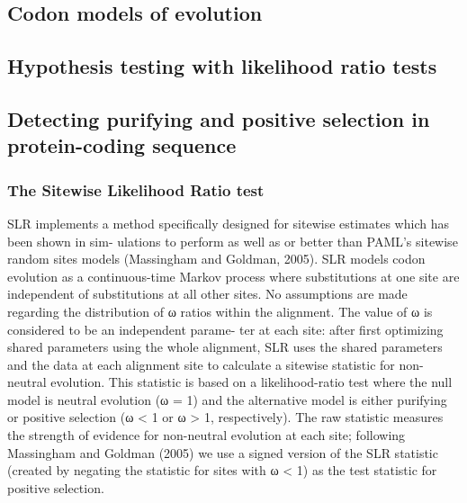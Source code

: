  \subsection{Codon models of evolution}
  \label{codon_intro}

  \subsection{Hypothesis testing with likelihood ratio tests}
  \label{ml_intro}

  \subsection{Detecting purifying and positive selection in protein-coding sequence}
  \label{pos-sel_intro}

  \subsubsection{The Sitewise Likelihood Ratio test}
  \label{slr_intro}
  SLR implements a method specifically designed for sitewise estimates
  which has been shown in sim- ulations to perform as well as or
  better than PAML’s sitewise random sites models (Massingham and
  Goldman, 2005). SLR models codon evolution as a continuous-time
  Markov process where substitutions at one site are independent of
  substitutions at all other sites. No assumptions are made regarding
  the distribution of ω ratios within the alignment. The value of ω is
  considered to be an independent parame- ter at each site: after
  first optimizing shared parameters using the whole alignment, SLR
  uses the shared parameters and the data at each alignment site to
  calculate a sitewise statistic for non-neutral evolution.  This
  statistic is based on a likelihood-ratio test where the null model
  is neutral evolution (ω = 1) and the alternative model is either
  purifying or positive selection (ω < 1 or ω > 1, respectively). The
  raw statistic measures the strength of evidence for non-neutral
  evolution at each site; following Massingham and Goldman (2005) we
  use a signed version of the SLR statistic (created by negating the
  statistic for sites with ω < 1) as the test statistic for positive
  selection.


